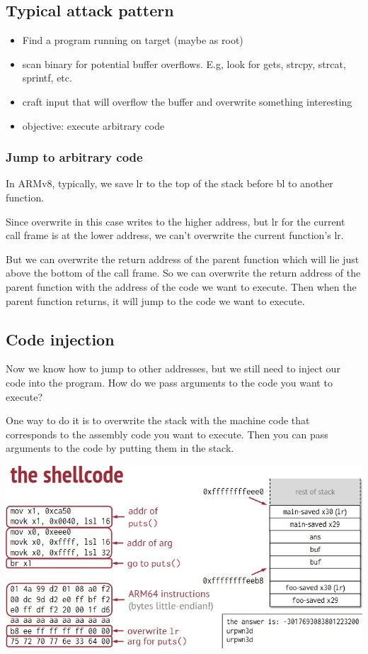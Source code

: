 \documentclass[letterpaper,12pt]{article}
\begin{document}
\subsection{Typical attack pattern}
\begin{itemize}
    \item Find a program running on target (maybe as root)
    \item scan binary for potential buffer overflows. E.g, look for gets, strcpy, strcat,
          sprintf, etc.
    \item craft input that will overflow the buffer and overwrite something interesting
    \item objective: execute arbitrary code
\end{itemize}
\subsubsection{Jump to arbitrary code}
In ARMv8, typically, we save lr to the top of the stack before bl to another
function.

Since overwrite in this case writes to the higher address, but lr for the
current call frame is at the lower address, we can't overwrite the current
function's lr.

But we can overwrite the return address of the parent function which will lie
just above the bottom of the call frame. So we can overwrite the return address
of the parent function with the address of the code we want to execute. Then
when the parent function returns, it will jump to the code we want to execute.

\subsection{Code injection}
Now we know how to jump to other addresses, but we still need to inject our
code into the program. How do we pass arguments to the code you want to
execute?

One way to do it is to overwrite the stack with the machine code that
corresponds to the assembly code you want to execute. Then you can pass
arguments to the code by putting them in the stack.

\includegraphics*[scale = 0.6]{./Images/Haxx attack v3.jpg}
\end{document}
